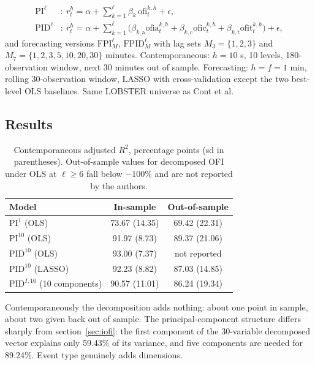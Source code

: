 \documentclass[11pt]{article}
\begin{document}
\begin{align}
\mathrm{PI}^{\ell}&:\ r_t^h=\alpha+\sum_{k=1}^{\ell}\beta_k\,\mathrm{ofi}_t^{k,h}+\epsilon,\\
\mathrm{PID}^{\ell}&:\ r_t^h=\alpha+\sum_{k=1}^{\ell}
\bigl(\beta_{k,\mathrm{a}}\mathrm{ofia}_t^{k,h}+\beta_{k,\mathrm{c}}\mathrm{ofic}_t^{k,h}
+\beta_{k,\mathrm{t}}\mathrm{ofit}_t^{k,h}\bigr)+\epsilon,
\end{align}
and forecasting versions $\mathrm{FPI}^{\ell}_M$, $\mathrm{FPID}^{\ell}_M$ with
lag sets $M_3=\{1,2,3\}$ and $M_7=\{1,2,3,5,10,20,30\}$ minutes. Contemporaneous:
$h=10$ s, 10 levels, 180-observation window, next 30 minutes out of sample.
Forecasting: $h=f=1$ min, rolling 30-observation window, LASSO with
cross-validation except the two best-level OLS baselines. Same LOBSTER universe
as Cont et al.

\subsection{Results}

\begin{table}[h]
\centering
\captionsetup{font=small}
\caption{Contemporaneous adjusted $R^2$, percentage points (sd in parentheses).
Out-of-sample values for decomposed OFI under OLS at $\ell\ge6$ fall below
$-100\%$ and are not reported by the authors.}
\small
\begin{tabular}{lcc}
\toprule
Model & In-sample & Out-of-sample \\
\midrule
$\mathrm{PI}^{1}$ (OLS)  & 73.67 (14.35) & 69.42 (22.31) \\
$\mathrm{PI}^{10}$ (OLS) & 91.97 (8.73)  & 89.37 (21.06) \\
$\mathrm{PID}^{10}$ (OLS) & 93.00 (7.37) & not reported \\
$\mathrm{PID}^{10}$ (LASSO) & 92.23 (8.82) & 87.03 (14.85) \\
$\mathrm{PID}^{I,10}$ (10 components) & 90.57 (11.01) & 86.24 (19.34) \\
\bottomrule
\end{tabular}
\end{table}

Contemporaneously the decomposition adds nothing: about one point in sample,
about two given back out of sample. The principal-component structure differs
sharply from section~\ref{sec:iofi}: the first component of the 30-variable
decomposed vector explains only 59.43\% of its variance, and five components are
needed for 89.24\%. Event type genuinely adds dimensions.
\end{document}
